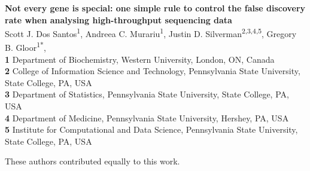 \documentclass[10pt,letterpaper]{article}
\begin{document}
\vspace*{0.2in}

\begin{flushleft}
{\Large
\textbf{Not every gene is special: one simple rule to control the false discovery rate when analysing high-throughput sequencing data} %
}
\newline
\\
Scott J. Dos Santos\textsuperscript{1\Yinyang},
Andreea C. Murariu\textsuperscript{1\Yinyang},
Justin D. Silverman\textsuperscript{2,3,4,5},
Gregory B. Gloor\textsuperscript{1*},
\\
\bigskip
\textbf{1} Department of Biochemistry, Western University, London, ON, Canada
\\
\textbf{2} College of Information Science and Technology, Pennsylvania State University, State College, PA, USA
\\
\textbf{3} Department of Statistics, Pennsylvania State University, State College, PA, USA
\\
\textbf{4} Department of Medicine, Pennsylvania State University, Hershey, PA, USA
\\
\textbf{5} Institute for Computational and Data Science, Pennsylvania State University, State College, PA, USA
\\
\bigskip

% 
%
\Yinyang These authors contributed equally to this work.



\end{flushleft}
\end{document}

